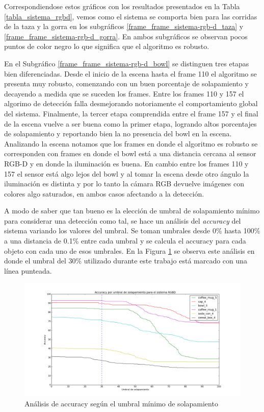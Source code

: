 Correspondiendose estos gráficos con los resultados presentados en la Tabla \ref{tabla_sistema_rgbd}, vemos como el sistema se comporta bien para las corridas de la taza y la gorra en los subgráficos \ref{frame_frame_sistema-rgb-d_taza} y \ref{frame_frame_sistema-rgb-d_gorra}. En ambos subgráficos se observan pocos puntos de color negro lo que significa que el algoritmo es robusto.

En el Subgráfico \ref{frame_frame_sistema-rgb-d_bowl} se distinguen tres etapas bien diferenciadas. Desde el inicio de la escena hasta el frame 110 el algoritmo se presenta muy robusto, comenzando con un buen porcentaje de solapamiento y decayendo a medida que se suceden los frames. Entre los frames 110 y 157 el algorimo de detección falla desmejorando notoriamente el comportamiento global del sistema. Finalmente, la tercer etapa comprendida entre el frame 157 y el final de la escena vuelve a ser buena como la primer etapa, logrando altos porcentajes de solapamiento y reportando bien la no presencia del bowl en la escena. Analizando la escena notamos que los frames en donde el algoritmo es robusto se corresponden con frames en donde el bowl está a una distancia cercana al sensor RGB-D y en donde la iluminación es buena. En cambio entre los frames 110 y 157 el sensor está algo lejos del bowl y al tomar la escena desde otro ángulo la iluminación es distinta y por lo tanto la cámara RGB devuelve imágenes con colores algo saturados, en ambos casos afectando a la detección.

A modo de saber que tan bueno es la elección de umbral de solapamiento mínimo para considerar una detección como tal, se hace un análisis del \textit{accuracy} del sistema variando los valores del umbral. Se toman umbrales desde 0\% hasta 100\% a una distancia de 0.1\% entre cada umbral y se calcula el accuracy para cada objeto con cada uno de esos umbrales. En la Figura \ref{fig:accuracy_sistema} se observa este análisis en donde el umbral del 30\% utilizado durante este trabajo está marcado con una línea punteada.

\begin{figure}
	\centering
	\includegraphics[width=\textwidth]{img/accuracy_sistemaRGBD.png}
	\caption{Análisis de accuracy según el umbral mínimo de solapamiento}
	\label{fig:accuracy_sistema}
\end{figure}

